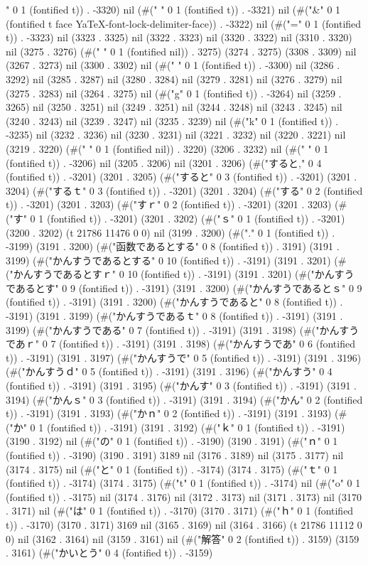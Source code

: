 {" 0 1 (fontified t)) . -3320) nil (#(" " 0 1 (fontified t)) . -3321) nil (#("&" 0 1 (fontified t face YaTeX-font-lock-delimiter-face)) . -3322) nil (#("=" 0 1 (fontified t)) . -3323) nil (3323 . 3325) nil (3322 . 3323) nil (3320 . 3322) nil (3310 . 3320) nil (3275 . 3276) (#(" " 0 1 (fontified nil)) . 3275) (3274 . 3275) (3308 . 3309) nil (3267 . 3273) nil (3300 . 3302) nil (#(" " 0 1 (fontified t)) . -3300) nil (3286 . 3292) nil (3285 . 3287) nil (3280 . 3284) nil (3279 . 3281) nil (3276 . 3279) nil (3275 . 3283) nil (3264 . 3275) nil (#("g" 0 1 (fontified t)) . -3264) nil (3259 . 3265) nil (3250 . 3251) nil (3249 . 3251) nil (3244 . 3248) nil (3243 . 3245) nil (3240 . 3243) nil (3239 . 3247) nil (3235 . 3239) nil (#("k" 0 1 (fontified t)) . -3235) nil (3232 . 3236) nil (3230 . 3231) nil (3221 . 3232) nil (3220 . 3221) nil (3219 . 3220) (#(" " 0 1 (fontified nil)) . 3220) (3206 . 3232) nil (#(" " 0 1 (fontified t)) . -3206) nil (3205 . 3206) nil (3201 . 3206) (#("すると," 0 4 (fontified t)) . -3201) (3201 . 3205) (#("すると" 0 3 (fontified t)) . -3201) (3201 . 3204) (#("するｔ" 0 3 (fontified t)) . -3201) (3201 . 3204) (#("する" 0 2 (fontified t)) . -3201) (3201 . 3203) (#("すｒ" 0 2 (fontified t)) . -3201) (3201 . 3203) (#("す" 0 1 (fontified t)) . -3201) (3201 . 3202) (#("ｓ" 0 1 (fontified t)) . -3201) (3200 . 3202) (t 21786 11476 0 0) nil (3199 . 3200) (#("." 0 1 (fontified t)) . -3199) (3191 . 3200) (#("函数であるとする" 0 8 (fontified t)) . 3191) (3191 . 3199) (#("かんすうであるとする" 0 10 (fontified t)) . -3191) (3191 . 3201) (#("かんすうであるとすｒ" 0 10 (fontified t)) . -3191) (3191 . 3201) (#("かんすうであるとす" 0 9 (fontified t)) . -3191) (3191 . 3200) (#("かんすうであるとｓ" 0 9 (fontified t)) . -3191) (3191 . 3200) (#("かんすうであると" 0 8 (fontified t)) . -3191) (3191 . 3199) (#("かんすうであるｔ" 0 8 (fontified t)) . -3191) (3191 . 3199) (#("かんすうである" 0 7 (fontified t)) . -3191) (3191 . 3198) (#("かんすうであｒ" 0 7 (fontified t)) . -3191) (3191 . 3198) (#("かんすうであ" 0 6 (fontified t)) . -3191) (3191 . 3197) (#("かんすうで" 0 5 (fontified t)) . -3191) (3191 . 3196) (#("かんすうｄ" 0 5 (fontified t)) . -3191) (3191 . 3196) (#("かんすう" 0 4 (fontified t)) . -3191) (3191 . 3195) (#("かんす" 0 3 (fontified t)) . -3191) (3191 . 3194) (#("かんｓ" 0 3 (fontified t)) . -3191) (3191 . 3194) (#("かん" 0 2 (fontified t)) . -3191) (3191 . 3193) (#("かｎ" 0 2 (fontified t)) . -3191) (3191 . 3193) (#("か" 0 1 (fontified t)) . -3191) (3191 . 3192) (#("ｋ" 0 1 (fontified t)) . -3191) (3190 . 3192) nil (#("の" 0 1 (fontified t)) . -3190) (3190 . 3191) (#("ｎ" 0 1 (fontified t)) . -3190) (3190 . 3191) 3189 nil (3176 . 3189) nil (3175 . 3177) nil (3174 . 3175) nil (#("と" 0 1 (fontified t)) . -3174) (3174 . 3175) (#("ｔ" 0 1 (fontified t)) . -3174) (3174 . 3175) (#("t" 0 1 (fontified t)) . -3174) nil (#("o" 0 1 (fontified t)) . -3175) nil (3174 . 3176) nil (3172 . 3173) nil (3171 . 3173) nil (3170 . 3171) nil (#("は" 0 1 (fontified t)) . -3170) (3170 . 3171) (#("ｈ" 0 1 (fontified t)) . -3170) (3170 . 3171) 3169 nil (3165 . 3169) nil (3164 . 3166) (t 21786 11112 0 0) nil (3162 . 3164) nil (3159 . 3161) nil (#("解答" 0 2 (fontified t)) . 3159) (3159 . 3161) (#("かいとう" 0 4 (fontified t)) . -3159) }
